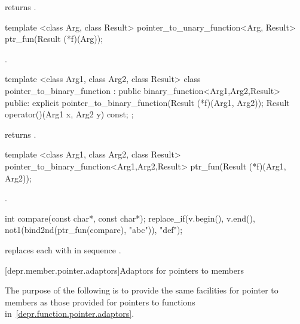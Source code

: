 \begin{itemdescr}
\pnum
{} returns .
\end{itemdescr}

%
\begin{itemdecl}
template <class Arg, class Result>
  pointer_to_unary_function<Arg, Result> ptr_fun(Result (*f)(Arg));
\end{itemdecl}

\begin{itemdescr}
\pnum
\returns
{}.
\end{itemdescr}

%
\begin{itemdecl}
template <class Arg1, class Arg2, class Result>
class pointer_to_binary_function :
  public binary_function<Arg1,Arg2,Result> {
public:
  explicit pointer_to_binary_function(Result (*f)(Arg1, Arg2));
  Result operator()(Arg1 x, Arg2 y) const;
};
\end{itemdecl}

\begin{itemdescr}
\pnum
{} returns .
\end{itemdescr}

%
\begin{itemdecl}
template <class Arg1, class Arg2, class Result>
  pointer_to_binary_function<Arg1,Arg2,Result>
    ptr_fun(Result (*f)(Arg1, Arg2));
\end{itemdecl}

\begin{itemdescr}
\pnum
\returns
{}.

\pnum
\enterexample
\begin{codeblock}
int compare(const char*, const char*);
replace_if(v.begin(), v.end(),
  not1(bind2nd(ptr_fun(compare), "abc")), "def");
\end{codeblock}

replaces each  with  in sequence .
\exitexample
\end{itemdescr}

[depr.member.pointer.adaptors]{Adaptors for pointers to members}

\pnum
The purpose of the following is to provide the same facilities for pointer to
members as those provided for pointers to functions
in~\ref{depr.function.pointer.adaptors}.

